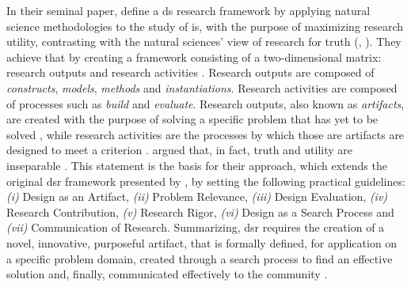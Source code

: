 In their seminal paper, \citeauthor{march_design_1995} \cite{march_design_1995} define a \gls{ds} research framework by applying natural science methodologies to the study of \gls{is}, with the purpose of maximizing research utility, contrasting with the natural sciences' view of research for truth (\cite[80]{hevner_design_2004}, \cite[253]{march_design_1995}). They achieve that by creating a framework consisting of a two-dimensional matrix: research outputs and research activities \cite[255]{march_design_1995}. Research outputs are composed of \textit{constructs}, \textit{models}, \textit{methods} and \textit{instantiations}. Research activities are composed of processes such as \textit{build} and \textit{evaluate}. Research outputs, also known as \textit{artifacts}, are created with the purpose of solving a specific problem that has yet to be solved \cite[78]{hevner_design_2004}, while research activities are the processes by which those are artifacts are designed to meet a criterion \cite[79--80]{hevner_design_2004}. \citeauthor{hevner_design_2004} \cite{hevner_design_2004} argued that, in fact, truth and utility are inseparable \cite[80]{hevner_design_2004}. This statement is the basis for their approach, which extends the original \gls{dsr} framework \cite{march_design_1995} presented by \citeauthor{march_design_1995} \cite{march_design_1995}, by setting the following practical guidelines: \emph{(i)} Design as an Artifact, \emph{(ii)} Problem Relevance, \emph{(iii)} Design Evaluation, \emph{(iv)} Research Contribution, \emph{(v)} Research Rigor, \emph{(vi)} Design as a Search Process and \emph{(vii)} Communication of Research. Summarizing, \gls{dsr} requires the creation of a novel, innovative, purposeful artifact, that is formally defined, for application on a specific problem domain, created through a search process to find an effective solution and, finally, communicated effectively to the community \cite[82]{hevner_design_2004}.

